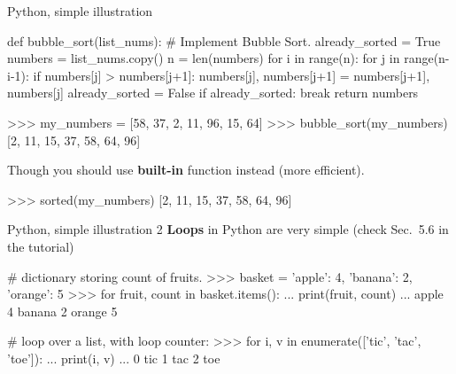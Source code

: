 \begin{frame}[fragile]{Python, simple illustration}
\vspace{-5mm}
\begin{python}
def bubble_sort(list_nums):
    # Implement Bubble Sort.
    already_sorted = True
    numbers = list_nums.copy()
    n = len(numbers)
    for i in range(n):
        for j in range(n-i-1):
            if numbers[j] > numbers[j+1]:
                numbers[j], numbers[j+1] = numbers[j+1], numbers[j]
                already_sorted = False
        if already_sorted:
            break
    return numbers
\end{python}
\pause
\begin{python}
>>> my_numbers = [58, 37, 2, 11, 96, 15, 64]
>>> bubble_sort(my_numbers)
[2, 11, 15, 37, 58, 64, 96]
\end{python}
\pause
Though you should use \textbf{built-in} function instead (more efficient).
\begin{python}
>>> sorted(my_numbers)
[2, 11, 15, 37, 58, 64, 96]
\end{python}
\end{frame}

\begin{frame}[fragile]{Python, simple illustration 2}
\vspace{-5mm}
\textbf{Loops} in Python are very simple (check Sec.~5.6 in the tutorial)
\begin{python}
# dictionary storing count of fruits.
>>> basket = {'apple': 4, 'banana': 2, 'orange': 5}
>>> for fruit, count in basket.items():
...   print(fruit, count)
... 
apple 4
banana 2
orange 5
\end{python}
\pause
\begin{python}
# loop over a list, with loop counter:
>>> for i, v in enumerate(['tic', 'tac', 'toe']):
...     print(i, v)
...
0 tic
1 tac
2 toe
\end{python}
\end{frame}

